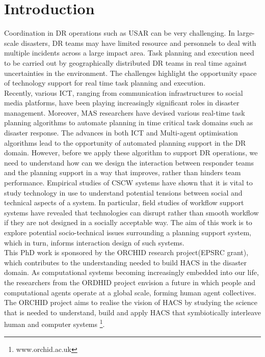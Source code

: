 \chapter{Introduction}\label{ch:introduction}
Coordination in \acf{DR} operations such as \acf{USAR} can be very challenging. In large-scale disasters, \ac{DR} teams may have limited resource and personnels to deal with multiple incidents across a large impact area. Task planning and execution need to be carried out by geographically distributed \ac{DR} teams in real time against uncertainties in the environment. The challenges highlight the opportunity space of technology support for real time task planning and execution.  \\ 

Recently, various \acf{ICT}, ranging from communication infrastructures to social media platforms, have been playing increasingly significant roles in  disaster management.  Moreover, \acf{MAS} researchers have devised various real-time task planning algorithms to automate planning in time critical task domains such as disaster response. The advances in both \ac{ICT} and Multi-agent optimisation algorithms lead to the opportunity of automated planning support in the \ac{DR} domain. However, before we apply these algorithm to support \ac{DR} operations, we need to understand how can we design the interaction between responder teams and the planning support in a way that improves, rather than hinders team performance. Empirical studies of \acf{CSCW} systems have shown that it is vital to study technology in use to understand potential tensions between social and technical aspects of a system. In particular, field studies of workflow support systems have revealed that technologies can disrupt rather than smooth workflow if they are not designed in a socially acceptable way. The aim of this work is to explore potential socio-technical issues surrounding a planning support system, which in turn, informs interaction design of such systems. \\

This PhD work is sponsored by the ORCHID research project(EPSRC grant), which contributes to the understanding needed to build \acf{HACS} in the disaster domain. As computational systems  becoming increasingly embedded into our life, the researchers from the ORDHID project envision a future in which people and computational agents operate at a global scale, forming human agent collectives. The ORCHID project aims to realise the vision of \ac{HACS} by studying the science that is needed to understand, build and apply \ac{HACS} that symbiotically interleave human and computer systems \footnote{www.orchid.ac.uk}.\\

